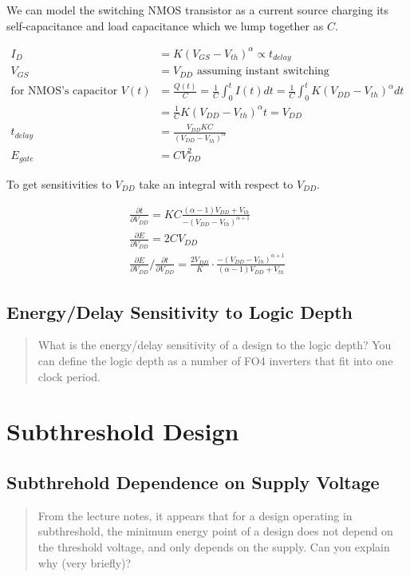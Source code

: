\documentclass[11pt]{article}
\begin{document}
We can model the switching NMOS transistor as a current source charging its self-capacitance and load capacitance which we lump together as $C$.

\begin{align}
	I_D &= K (V_{GS} - V_{th})^\alpha \propto t_{delay} \nonumber \\
	V_{GS} &= V_{DD} \text{ assuming instant switching} \nonumber \\
	\text{for NMOS's capacitor } V(t) &= \frac{Q(t)}{C} = \frac{1}{C}\int_{0}^{t}I(t) dt = \frac{1}{C}\int_{0}^{t} K (V_{DD} - V_{th})^\alpha dt \nonumber \\
	&= \frac{1}{C} K (V_{DD} - V_{th})^\alpha t = V_{DD} \nonumber \\
	t_{delay} &= \frac{V_{DD} K C}{(V_{DD} - V_{th})^\alpha} \nonumber \\
	E_{gate} &= C V_{DD}^2 \nonumber
\end{align}

To get sensitivities to $V_{DD}$ take an integral with respect to $V_{DD}$.

\begin{align}
	\frac{\partial t}{\partial V_{DD}} = K C \frac{(\alpha - 1)V_{DD} + V_{th}}{-(V_{DD} - V_{th})^{\alpha + 1}} \nonumber \\
	\frac{\partial E}{\partial V_{DD}} = 2 C V_{DD} \nonumber \\
	\frac{\partial E}{\partial V_{DD}} \bigg/ \frac{\partial t}{\partial V_{DD}} = \frac{2 V_{DD}}{K} \cdot \frac{-(V_{DD} - V_{th})^{\alpha+1}}{(\alpha - 1)V_{DD} + V_{th}} \nonumber 
\end{align}

\subsection{Energy/Delay Sensitivity to Logic Depth}
\begin{quote}
	What is the energy/delay sensitivity of a design to the logic depth? You can define the logic depth as a number of FO4 inverters that fit into one clock period.
\end{quote}

\section{Subthreshold Design}
\subsection{Subthrehold Dependence on Supply Voltage}
\begin{quote}
	From the lecture notes, it appears that for a design operating in subthreshold, the minimum energy point of a design does not depend on the threshold voltage, and only depends on the supply. Can you explain why (very briefly)?
\end{quote}
\end{document}
